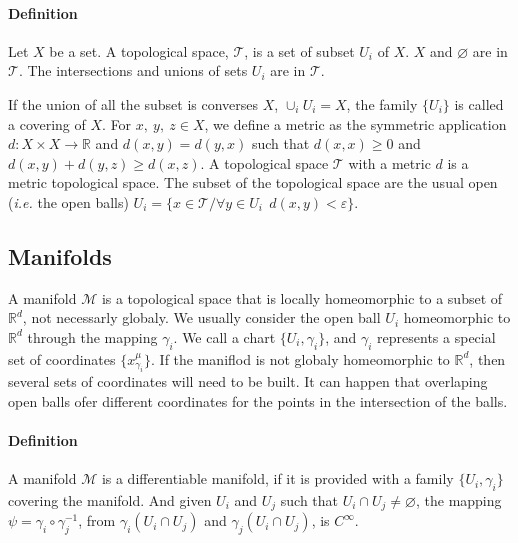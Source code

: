 \documentclass[final, paper=letter,5p,times,twocolumn]{elsarticle}
\theoremstyle{definition}
\begin{document}
\paragraph{Definition}{Let $X$ be a set. A topological space, $\mathcal{T}$, is a set of subset $U_{i}$ of $X$. $X$ and $\varnothing$ are in $\mathcal{T}$. The intersections and unions of sets $U_{i}$ are in $\mathcal{T}$.

  If the union of all the subset is converses $X$, $\cup_{i} U_{i} = X$, the family $\{U_{i} \}$ is called a covering of $X$.
For $x,~y,~z \in X$, we define a metric as the symmetric application $d : X \times X \rightarrow \mathbb{R}$ and $d(x,y) = d(y,x)$ such that $d(x,x) \ge 0$ and $d(x,y) + d(y,z) \ge d(x,z)$. A topological space $\mathcal{T}$ with a metric $d$ is a metric topological space. The subset of the topological space are the usual open ({\it i.e.} the open balls) $U_{i} = \{ x \in \mathcal{T} / \forall y \in U_{i} ~~ d(x,y) < \varepsilon \}$.
  
\subsection{Manifolds}

A manifold $\mathcal{M}$ is a topological space that is locally homeomorphic to a subset of $\mathbb{R}^{d}$, not necessarly globaly. We usually consider the open ball $U_{i}$ homeomorphic to $\mathbb{R}^{d}$ through the mapping $\gamma_{i}$. We call a chart $\{U_{i}, \gamma_{i}\}$, and $\gamma_{i}$ represents a special set of coordinates $\{x_{\gamma_{i}}^{\mu}\}$. If the maniflod is not globaly homeomorphic to $\mathbb{R}^{d}$, then several sets of coordinates will need to be built. It can happen that overlaping open balls ofer different coordinates for the points in the intersection of the balls.

\paragraph{Definition}{A manifold $\mathcal{M}$ is a differentiable manifold, if it is provided with a family $\{U_{i}, \gamma_{i}\}$ covering the manifold. And given $U_{i}$ and $U_{j}$ such that $U_{i} \cap U_{j} \ne \varnothing$, the mapping $\psi = \gamma_{i} \circ \gamma_{j}^{-1}$, from $\gamma_{i}(U_{i} \cap U_{j})$ and $\gamma_{j}(U_{i} \cap U_{j})$, is $C^{\infty}$.}

}
\end{document}
